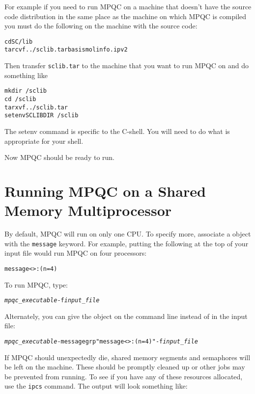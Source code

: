 For example if you need to run MPQC on a machine that doesn't
have the source code distribution in the same place as the
machine on which MPQC is compiled you must do the following
on the machine with the source code:

\begin{alltt}
cd SC/lib
tar cvf ../sclib.tar basis molinfo.ipv2
\end{alltt}

Then transfer \verb|sclib.tar| to the machine that you want to run
MPQC on and do something like

\begin{alltt}
mkdir ~/sclib
cd ~/sclib
tar xvf ../sclib.tar
setenv SCLIBDIR ~/sclib
\end{alltt}

The setenv command is specific to the C-shell.  You will need to
do what is appropriate for your shell.

Now MPQC should be ready to run.

\section{Running MPQC on a Shared Memory Multiprocessor}

By default, MPQC will run on only one CPU.  To specify more, associate
a  object with the \verb|message|
keyword.  For example, putting the following at the top of your input file
would run MPQC on four processors:

\begin{alltt}
message<>:(n = 4)
\end{alltt}


To run MPQC, type:
\begin{alltt}
{\itshape mpqc_executable} {\ttfamily -f} {\itshape input_file}
\end{alltt}

  Alternately, you can give the  object on
the command line instead of in the input file:
\begin{alltt}
{\itshape mpqc_executable} {\ttfamily -messagegrp "message<>:(n = 4)" -f} {\itshape input_file}
\end{alltt}

If MPQC should unexpectedly die, shared memory segments and
semaphores will be left on the machine.  These should be promptly
cleaned up or other jobs may be prevented from running.  To
see if you have any of these resources allocated, use the
\verb|ipcs| command.  The output will look something
like:

